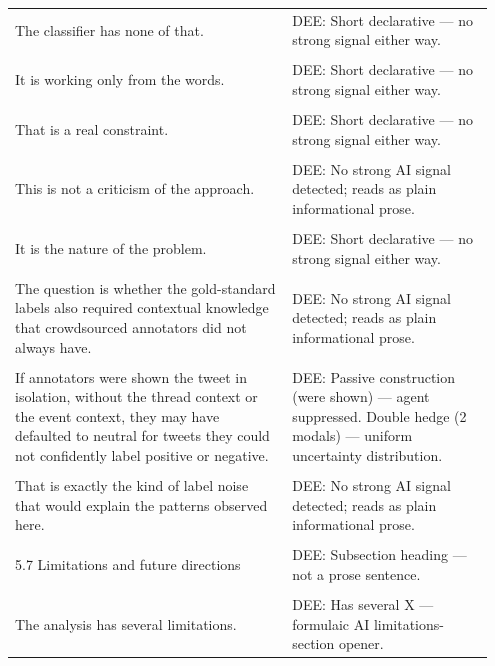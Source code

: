 \documentclass[11pt]{article}
\begin{document}
\begin{longtable}{|p{0.55\linewidth}|p{0.40\linewidth}|}
\hline
\rule{0pt}{3.5cm} & \\
\hline
The classifier has none of that. & DEE: Short declarative --- no strong signal either way. \\[2pt]
\hline
\rule{0pt}{3.5cm} & \\
\hline
It is working only from the words. & DEE: Short declarative --- no strong signal either way. \\[2pt]
\hline
\rule{0pt}{3.5cm} & \\
\hline
That is a real constraint. & DEE: Short declarative --- no strong signal either way. \\[2pt]
\hline
\rule{0pt}{3.5cm} & \\
\hline
This is not a criticism of the approach. & DEE: No strong AI signal detected; reads as plain informational prose. \\[2pt]
\hline
\rule{0pt}{3.5cm} & \\
\hline
It is the nature of the problem. & DEE: Short declarative --- no strong signal either way. \\[2pt]
\hline
\rule{0pt}{3.5cm} & \\
\hline
The question is whether the gold-standard labels also required contextual knowledge that crowdsourced annotators did not always have. & DEE: No strong AI signal detected; reads as plain informational prose. \\[2pt]
\hline
\rule{0pt}{3.5cm} & \\
\hline
If annotators were shown the tweet in isolation, without the thread context or the event context, they may have defaulted to neutral for tweets they could not confidently label positive or negative. & DEE: Passive construction (were shown) --- agent suppressed. Double hedge (2 modals) --- uniform uncertainty distribution. \\[2pt]
\hline
\rule{0pt}{3.5cm} & \\
\hline
That is exactly the kind of label noise that would explain the patterns observed here. & DEE: No strong AI signal detected; reads as plain informational prose. \\[2pt]
\hline
\rule{0pt}{3.5cm} & \\
\hline
5.7 Limitations and future directions & DEE: Subsection heading --- not a prose sentence. \\[2pt]
\hline
\rule{0pt}{3.5cm} & \\
\hline
The analysis has several limitations. & DEE: Has several X --- formulaic AI limitations-section opener. \\[2pt]

\end{longtable}
\end{document}

